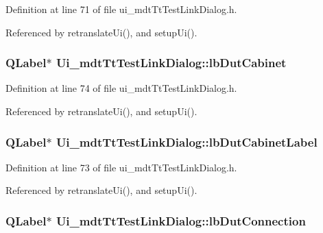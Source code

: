 Definition at line 71 of file ui\-\_\-mdt\-Tt\-Test\-Link\-Dialog.\-h.



Referenced by retranslate\-Ui(), and setup\-Ui().

\hypertarget{class_ui__mdt_tt_test_link_dialog_aed0b4ca19ecbb6d658040d54b0f146b9}{
\subsubsection[{lb\-Dut\-Cabinet}]{\setlength{\rightskip}{0pt plus 5cm}Q\-Label$\ast$ Ui\-\_\-mdt\-Tt\-Test\-Link\-Dialog\-::lb\-Dut\-Cabinet}}\label{class_ui__mdt_tt_test_link_dialog_aed0b4ca19ecbb6d658040d54b0f146b9}


Definition at line 74 of file ui\-\_\-mdt\-Tt\-Test\-Link\-Dialog.\-h.



Referenced by retranslate\-Ui(), and setup\-Ui().

\hypertarget{class_ui__mdt_tt_test_link_dialog_a5a3ed51f599ebb82a7789be0bc4a4736}{
\subsubsection[{lb\-Dut\-Cabinet\-Label}]{\setlength{\rightskip}{0pt plus 5cm}Q\-Label$\ast$ Ui\-\_\-mdt\-Tt\-Test\-Link\-Dialog\-::lb\-Dut\-Cabinet\-Label}}\label{class_ui__mdt_tt_test_link_dialog_a5a3ed51f599ebb82a7789be0bc4a4736}


Definition at line 73 of file ui\-\_\-mdt\-Tt\-Test\-Link\-Dialog.\-h.



Referenced by retranslate\-Ui(), and setup\-Ui().

\hypertarget{class_ui__mdt_tt_test_link_dialog_a4b857f0b1b38c97452223753c30628f2}{
\subsubsection[{lb\-Dut\-Connection}]{\setlength{\rightskip}{0pt plus 5cm}Q\-Label$\ast$ Ui\-\_\-mdt\-Tt\-Test\-Link\-Dialog\-::lb\-Dut\-Connection}}\label{class_ui__mdt_tt_test_link_dialog_a4b857f0b1b38c97452223753c30628f2}



